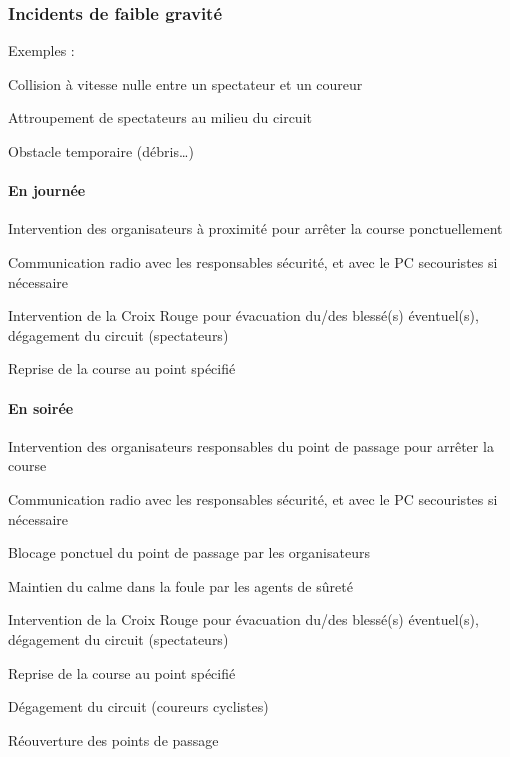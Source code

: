 \documentclass[hidelinks, paper=a4, fontsize=13pt]{report}
\begin{document}
\subsubsection{Incidents de faible gravité}


Exemples :
\begin{list}{•}{}
\item Collision à vitesse nulle entre un spectateur et un coureur
\item Attroupement de spectateurs au milieu du circuit
\item Obstacle temporaire (débris…)
\end{list}


\paragraph{En journée}

\begin{list}{•}{}
\item Intervention des organisateurs à proximité pour arrêter la course ponctuellement 
\item Communication radio avec les responsables sécurité, et avec le PC secouristes si nécessaire
\item Intervention de la Croix Rouge pour évacuation du/des blessé(s) éventuel(s), dégagement du circuit (spectateurs)
\item Reprise de la course au point spécifié
\end{list}


\paragraph{En soirée}
\begin{list}{•}{}
\item Intervention des organisateurs responsables du point de passage pour arrêter la course
\item Communication radio avec les responsables sécurité, et avec le PC secouristes si nécessaire
\item Blocage ponctuel du point de passage par les organisateurs
\item Maintien du calme dans la foule par les agents de sûreté
\item Intervention de la Croix Rouge pour évacuation du/des blessé(s) éventuel(s), dégagement du circuit (spectateurs)
\item Reprise de la course au point spécifié
\item Dégagement du circuit (coureurs cyclistes)
\item Réouverture des points de passage
\end{list}
\end{document}
